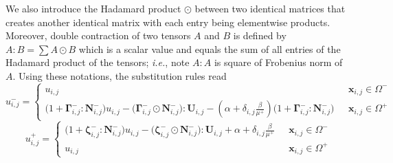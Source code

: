 \documentclass{elsarticle}
\begin{document}
We also introduce the Hadamard product $\odot$ between two identical matrices that creates another identical matrix with each entry being elementwise products. Moreover, double contraction of two tensors $A$ and $B$ is defined by $A : B = \sum A \odot B$ which is a scalar value and equals the sum of all entries of the Hadamard product of the tensors; \textit{i.e.}, note $A:A$ is square of Frobenius norm of $A$. Using these notations, the substitution rules read
\begin{equation}
 u_{i,j}^-=\begin{cases}
    u_{i,j}   & \text{ $\mathbf{x}_{i,j}\in \Omega^-$}\\
     \big(1 + \boldsymbol{\Gamma}^-_{i,j} : \mathbf{N}^-_{i,j}  \big) u_{i,j} -  \big( \boldsymbol{\Gamma}^-_{i,j}  \odot \mathbf{N}^-_{i,j} \big) : \mathbf{U}_{i,j}  - (\alpha + \delta_{i,j}\frac{\beta}{\mu^+}) \big(1 + \boldsymbol{\Gamma}^-_{i,j} : \mathbf{N}^-_{i,j} \big) & \text{ $\mathbf{x}_{i,j}\in \Omega^+$}
  \end{cases}
\end{equation}
\begin{equation}
 u_{i,j}^+=\begin{cases}
     \big(1 + \boldsymbol{\zeta}^-_{i,j} : \mathbf{N}^-_{i,j}   \big) u_{i,j} - \big( \boldsymbol{\zeta}^-_{i,j}  \odot \mathbf{N}^-_{i,j}  \big) : \mathbf{U}_{i,j} + \alpha + \delta_{i,j}\frac{\beta}{\mu^+}& \text{ $\mathbf{x}_{i,j}\in \Omega^-$}\\
    u_{i,j} & \text{ $\mathbf{x}_{i,j}\in \Omega^+$}
  \end{cases}
\end{equation}
\end{document}
